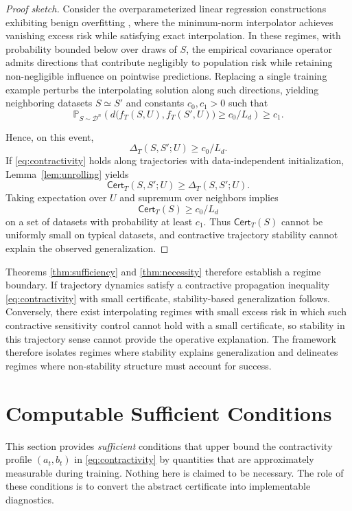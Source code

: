 \documentclass{article}
\numberwithin{equation}{section}
\begin{document}
\begin{proof}[Proof sketch]
	Consider the overparameterized linear regression constructions exhibiting benign overfitting \cite{BartlettLongLugosiTsigler2020}, where the minimum-norm interpolator achieves vanishing excess risk while satisfying exact interpolation. In these regimes, with probability bounded below over draws of $S$, the empirical covariance operator admits directions that contribute negligibly to population risk while retaining non-negligible influence on pointwise predictions. Replacing a single training example perturbs the interpolating solution along such directions, yielding neighboring datasets $S\simeq S'$ and constants $c_0,c_1>0$ such that
	\[
	\mathbb{P}_{S\sim \mathcal{D}^n}
	\!\left(
	d\big(f_T(S,U),f_T(S',U)\big)\ge c_0/L_d
	\right)\ge c_1.
	\]
	
	Hence, on this event,
	\[
	\Delta_T(S,S';U)\ge c_0/L_d.
	\]
	If \eqref{eq:contractivity} holds along trajectories with data-independent initialization, Lemma~\ref{lem:unrolling} yields
	\[
	\mathsf{Cert}_T(S,S';U)\ge \Delta_T(S,S';U).
	\]
	Taking expectation over $U$ and supremum over neighbors implies
	\[
	\mathsf{Cert}_T(S)\ge c_0/L_d
	\]
	on a set of datasets with probability at least $c_1$.
	Thus $\mathsf{Cert}_T(S)$ cannot be uniformly small on typical datasets, and contractive trajectory stability cannot explain the observed generalization.
\end{proof}Theorems \ref{thm:sufficiency} and \ref{thm:necessity} therefore establish a regime boundary. If trajectory dynamics satisfy a contractive propagation inequality \eqref{eq:contractivity} with small certificate, stability-based generalization follows. Conversely, there exist interpolating regimes with small excess risk in which such contractive sensitivity control cannot hold with a small certificate, so stability in this trajectory sense cannot provide the operative explanation. The framework therefore isolates regimes where stability explains generalization and delineates regimes where non-stability structure must account for success.

\section{Computable Sufficient Conditions}
\label{sec:computable}

This section provides \emph{sufficient} conditions that upper bound the contractivity profile $(a_t,b_t)$ in \eqref{eq:contractivity} by quantities that are approximately measurable during training.
Nothing here is claimed to be necessary.
The role of these conditions is to convert the abstract certificate into implementable diagnostics.
\end{document}

